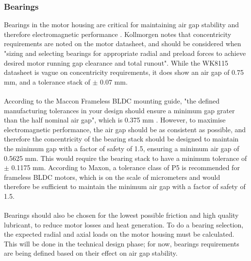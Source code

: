 \documentclass[internal]{../../../classes/nervtech-research}
\begin{document}
\subsubsection{Bearings}
Bearings in the motor housing are critical for maintaining air gap stability and therefore electromagnetic performance \cite{KollmorgenManual}.
Kollmorgen notes that concentricity requirements are noted on the motor datasheet, and should be considered when "sizing and selecting bearings for appropriate radial and preload forces to achieve desired motor running gap clearance and total runout".
While the WK8115 datasheet is vague on concentricity requirements, it does show an air gap of 0.75 mm, and a tolerance stack of $\pm$ 0.07 mm.
\\\\
According to the Maccon Frameless BLDC mounting guide, "the defined manufacturing tolerances in your design should ensure a minimum gap grater
than the half nominal air gap", which is 0.375 mm \cite{MacconManual}.
However, to maximise electromagnetic performance, the air gap should be as consistent as possible, and therefore the concentricity of the bearing stack should be designed to maintain the minimum gap with a factor of safety of 1.5, ensuring a minimum air gap of 0.5625 mm.
This would require the bearing stack to have a minimum tolerance of $\pm$ 0.1175 mm.
According to Maxon, a tolerance class of P5 is recommended for frameless BLDC motors, which is on the scale of micrometers and would therefore be sufficient to maintain the minimum air gap with a factor of safety of 1.5. \cite{MaxonManual}
\\\\
Bearings should also be chosen for the lowest possible friction and high quality lubricant, to reduce motor losses and heat generation.
To do a bearing selection, the expected radial and axial loads on the motor housing must be calculated.
This will be done in the technical design phase; for now, bearings requirements are being defined based on their effect on air gap stability.
\end{document}
